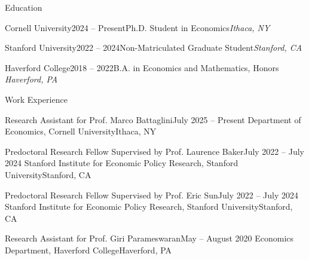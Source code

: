 \documentclass{resume}
\begin{document}
\begin{rSection}{Education}
\begin{rSubsection}{Cornell University}{2024 -- Present}{Ph.D. Student in Economics}{\em Ithaca, NY}
\item[]
\vspace{-1cm}
\end{rSubsection}

\begin{rSubsection}{Stanford University}{2022 -- 2024}{Non-Matriculated Graduate Student}{\em Stanford, CA}
\item[]
\vspace{-1cm}
\end{rSubsection}
\begin{rSubsection}{Haverford College}{2018 -- 2022}{B.A. in Economics and Mathematics, Honors \hfill \em Haverford, PA \\}{}
\item[]
\vspace{-1cm}
\vspace{-0.5cm}
\end{rSubsection}
\end{rSection}

\begin{rSection}{Work Experience}

\begin{rSubsection}{Research Assistant for Prof. Marco Battaglini}{July 2025 -- Present}{  Department of Economics, Cornell University}{Ithaca, NY}
\item[]
\vspace{-1cm}
\end{rSubsection}

\begin{rSubsection}{Predoctoral Research Fellow Supervised by Prof. Laurence Baker}{July 2022 -- July 2024}{  Stanford Institute for Economic Policy Research, Stanford University}{Stanford, CA}
\item[]
\vspace{-1cm}
\end{rSubsection}
\begin{rSubsection}{Predoctoral Research Fellow Supervised by Prof. Eric Sun}{July 2022 -- July 2024}{  Stanford Institute for Economic Policy Research, Stanford University}{Stanford, CA}
\item[]
\vspace{-1cm}
\end{rSubsection}

\begin{rSubsection}{Research Assistant for Prof. Giri Parameswaran}{May -- August 2020}{  Economics Department, Haverford College}{Haverford, PA}
\item[]
\vspace{-1cm}
\end{rSubsection}
\end{rSection}
\end{document}
